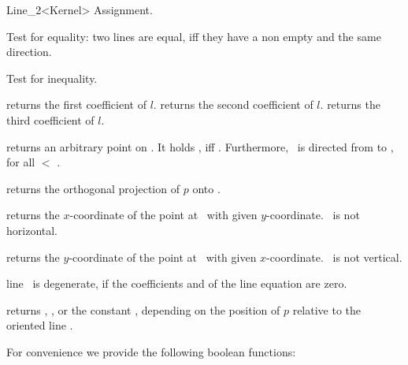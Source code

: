 \begin{ccRefClass} {Line_2<Kernel>}
\ccHidden {}
        {Assignment.}

       {Test for equality: two lines are equal, iff they have a non 
        empty  and the same direction.}

       {Test for inequality.}


       {returns the first coefficient of $l$.}
\ccGlue
{}
       {returns the second coefficient of $l$.}
\ccGlue
{}
       {returns the third coefficient of $l$.}

       {returns an arbitrary point on \ccVar. It holds 
        , iff .
        Furthermore, \ccVar\ is directed from 
        to , for all  $<$ .}

       {returns the orthogonal projection of $p$ onto \ccVar.}

       {returns the $x$-coordinate of the point at \ccVar\ with
        given $y$-coordinate.
        \ccPrecond \ccVar\ is not horizontal.}

       {returns the $y$-coordinate of the point at \ccVar\ with
        given $x$-coordinate.
        \ccPrecond \ccVar\ is not vertical.}


       {line \ccVar\ is degenerate, if the coefficients  and 
         of the line equation are zero.}

       {}
\ccGlue
{}
       {}

       {returns ,
        , or the constant
        ,
        depending on the position of $p$  relative to the oriented line \ccVar.
        }


For convenience we provide the following boolean functions:


\end{ccRefClass}
